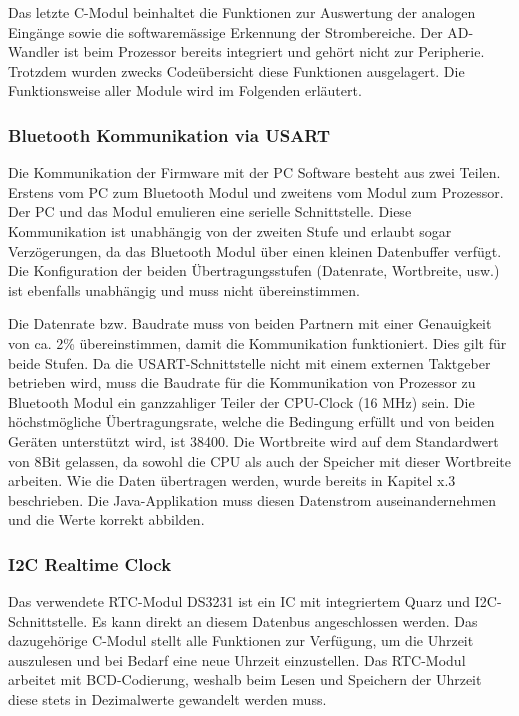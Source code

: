 Das letzte C-Modul beinhaltet die Funktionen zur Auswertung der analogen Eingänge sowie die softwaremässige Erkennung der Strombereiche. Der AD-Wandler ist beim Prozessor bereits integriert und gehört nicht zur Peripherie. Trotzdem wurden zwecks Codeübersicht diese Funktionen ausgelagert. Die Funktionsweise aller Module wird im Folgenden erläutert.

\subsubsection*{Bluetooth Kommunikation via USART}
Die Kommunikation der Firmware mit der PC Software besteht aus zwei Teilen. Erstens vom PC zum Bluetooth Modul und zweitens vom Modul zum Prozessor. Der PC und das Modul emulieren eine serielle Schnittstelle. Diese Kommunikation ist unabhängig von der zweiten Stufe und erlaubt sogar Verzögerungen, da das Bluetooth Modul über einen kleinen Datenbuffer verfügt. Die Konfiguration der beiden Übertragungsstufen (Datenrate, Wortbreite, usw.) ist ebenfalls unabhängig und muss nicht übereinstimmen.  

Die Datenrate bzw. Baudrate muss von beiden Partnern mit einer Genauigkeit von ca. 2\% übereinstimmen, damit die Kommunikation funktioniert. Dies gilt für beide Stufen. Da die USART-Schnittstelle nicht mit einem externen Taktgeber betrieben wird, muss die Baudrate für die Kommunikation von Prozessor zu Bluetooth Modul ein ganzzahliger Teiler der CPU-Clock (16 MHz) sein. Die höchstmögliche Übertragungsrate, welche die Bedingung erfüllt und von beiden Geräten unterstützt wird, ist 38400. Die Wortbreite wird auf dem Standardwert von 8Bit gelassen, da sowohl die CPU als auch der Speicher mit dieser Wortbreite arbeiten.
Wie die Daten übertragen werden, wurde bereits in Kapitel x.3 beschrieben. Die Java-Applikation muss diesen Datenstrom auseinandernehmen und die Werte korrekt abbilden.  

\subsubsection*{I2C Realtime Clock}
Das verwendete RTC-Modul DS3231 ist ein IC mit integriertem Quarz und I2C-Schnittstelle. Es kann direkt an diesem Datenbus angeschlossen werden. Das dazugehörige C-Modul stellt alle Funktionen zur Verfügung, um die Uhrzeit auszulesen und bei Bedarf eine neue Uhrzeit einzustellen. Das RTC-Modul arbeitet mit BCD-Codierung, weshalb beim Lesen und Speichern der Uhrzeit diese stets in Dezimalwerte gewandelt werden muss.

